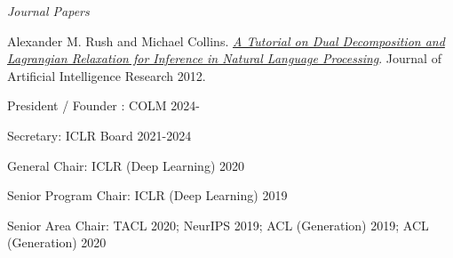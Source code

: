 \documentclass[10pt]{article}
\begin{document}
{%

\vspace{0.3in}

\noindent\emph{Journal Papers \vspace{0.01in}}

\ind Alexander M. Rush and Michael Collins. \emph{\href{http://www.cs.columbia.edu/~mcollins/acltutorial.pdf}{A Tutorial on Dual Decomposition and Lagrangian Relaxation for Inference in Natural Language Processing}}. Journal of Artificial Intelligence Research 2012.









\medskip


\bigskip

\ind President / Founder :
\ind COLM 2024-

\ind Secretary:
\ind ICLR Board 2021-2024

\ind General  Chair:
\ind ICLR (Deep Learning) 2020

\ind Senior Program Chair:
\ind ICLR (Deep Learning) 2019

\ind Senior Area Chair:
\ind TACL 2020; NeurIPS 2019; ACL (Generation) 2019; ACL (Generation) 2020

}
\end{document}

